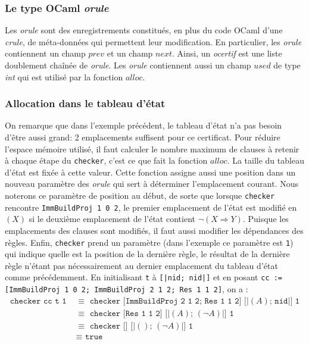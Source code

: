 \documentclass[11pt]{article}
\begin{document}
\subsubsection{Le type OCaml \textit{orule}}

 Les \textit{orule} sont des enregistrements constitués, en plus du code OCaml d'une \textit{crule}, de méta-données qui permettent leur modification. En particulier, les \textit{orule} contiennent un champ $prev$ et un champ $next$. Ainsi, un \textit{ocertif} est une liste doublement chaînée de \textit{orule}. Les \textit{orule} contiennent aussi un champ $used$ de type \textit{int} qui est utilisé par la fonction $alloc$.


\subsubsection{Allocation dans le tableau d'état} \label{alloc}

On remarque que dans l'exemple précédent, le tableau d'état n'a pas besoin d'être aussi grand: 2 emplacements suffisent pour ce certificat. Pour réduire l'espace mémoire utilisé, il faut calculer le nombre maximum de clauses à retenir à chaque étape du \texttt{checker}, c'est ce que fait la fonction $alloc$. La taille du tableau d'état est fixée à cette valeur. Cette fonction assigne aussi une position dans un nouveau paramètre des \textit{orule} qui sert à déterminer l'emplacement courant. Nous noterons ce paramètre de position au début, de sorte que lorsque \texttt{checker} rencontre \texttt{ImmBuildProj 1 0 2}, le premier emplacement de l'état est modifié en $(X)$ si le deuxième emplacement de l'état contient $\neg(X \Rightarrow Y)$. Puisque les emplacements des clauses sont modifiés, il faut aussi modifier les dépendances des règles. Enfin, \texttt{checker} prend un paramètre (dans l'exemple ce paramètre est \texttt{1}) qui indique quelle est la position de la dernière règle, le résultat de la dernière règle n'étant pas nécessairement au dernier emplacement du tableau d'état comme précédemment. En initialisant \texttt{t} à \texttt{[|nid; nid|]} et en posant \texttt{cc := [ImmBuildProj 1 0 2; ImmBuildProj 2 1 2; Res 1 1 2]}, on a :
\begin{align*}
  \texttt{checker cc t 1} \,\,&\equiv \,\, \texttt{checker [ImmBuildProj 2 1 2; Res 1 1 2] [|}(A)\texttt{; nid|] 1} \\
    &\equiv \,\,\texttt{checker [Res 1 1 2] [|}(A)\texttt{; }(\neg A)\texttt{|] 1} \\
    &\equiv \,\,\texttt{checker [] [|}()\texttt{; }(\neg A)\texttt{|] 1} \\
    &\equiv \,\,\texttt{true}
\end{align*}
\end{document}
